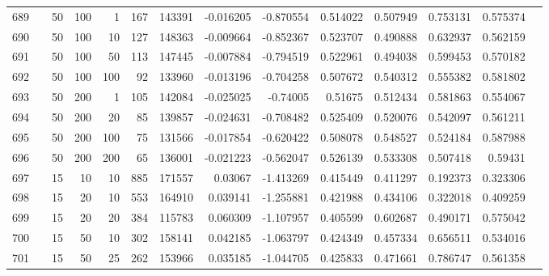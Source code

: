 \begin{longtable}{llrrrrrrrrrrrr}
		689 & &           50 &               100 &            1 &         167 &     143391 & -0.016205 & -0.870554 &  0.514022 &    0.507949 &       0.753131 &  0.575374 \\
		690 & &           50 &               100 &           10 &         127 &     148363 & -0.009664 & -0.852367 &  0.523707 &    0.490888 &       0.632937 &  0.562159 \\
		691 & &           50 &               100 &           50 &         113 &     147445 & -0.007884 & -0.794519 &  0.522961 &    0.494038 &       0.599453 &  0.570182 \\
		692 & &           50 &               100 &          100 &          92 &     133960 & -0.013196 & -0.704258 &  0.507672 &    0.540312 &       0.555382 &  0.581802 \\
		693 & &           50 &               200 &            1 &         105 &     142084 & -0.025025 &  -0.74005 &   0.51675 &    0.512434 &       0.581863 &  0.554067 \\
		694 & &           50 &               200 &           20 &          85 &     139857 & -0.024631 & -0.708482 &  0.525409 &    0.520076 &       0.542097 &  0.561211 \\
		695 & &           50 &               200 &          100 &          75 &     131566 & -0.017854 & -0.620422 &  0.508078 &    0.548527 &       0.524184 &  0.587988 \\
		696 & &           50 &               200 &          200 &          65 &     136001 & -0.021223 & -0.562047 &  0.526139 &    0.533308 &       0.507418 &   0.59431 \\\midrule
		697 & \multirow[t]{56}{*}{\rotatebox[origin=r]{90}{use-tf-idf-weighted}} &           15 &                10 &           10 &         885 &     171557 &   0.03067 & -1.413269 &  0.415449 &    0.411297 &       0.192373 &  0.323306 \\
		698 & &           15 &                20 &           10 &         553 &     164910 &  0.039141 & -1.255881 &  0.421988 &    0.434106 &       0.322018 &  0.409259 \\
		699 & &           15 &                20 &           20 &         384 &     115783 &  0.060309 & -1.107957 &  0.405599 &    0.602687 &       0.490171 &  0.575042 \\
		700 & &           15 &                50 &           10 &         302 &     158141 &  0.042185 & -1.063797 &  0.424349 &    0.457334 &       0.656511 &  0.534016 \\
		701 & &           15 &                50 &           25 &         262 &     153966 &  0.035185 & -1.044705 &  0.425833 &    0.471661 &       0.786747 &  0.561358 \\

\end{longtable}
